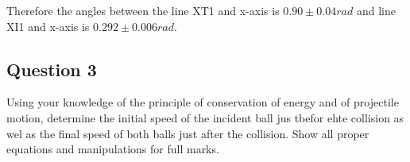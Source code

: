 \documentclass[12pt]{article}
\begin{document}
Therefore the angles between the line XT1 and x-axis is $0.90\pm0.04rad$ and line XI1 and x-axis is $0.292\pm0.006rad$.

\pagebreak

\subsection{Question 3}
Using your knowledge of the principle of conservation of energy and of projectile motion, determine the initial speed of the incident ball jus tbefor ehte collision as wel as the final speed of both balls just after the collision. Show all proper equations and manipulations for full marks.
\end{document}
